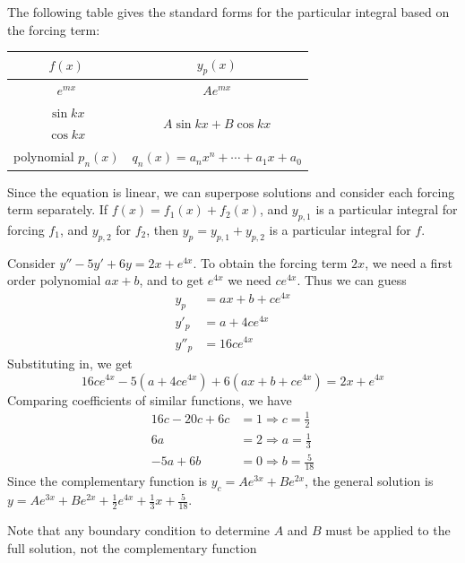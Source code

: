 \documentclass[a4paper]{article}
\begin{document}
\begin{remark}
  The following table gives the standard forms for the particular integral based on the forcing term:
  \begin{center}
    \begin{tabular}{cc}
      \toprule
      $f(x)$ & $y_p(x)$\\
      \midrule
      $e^{mx}$ & $Ae^{mx}$\\
      $\sin kx$ & \multirow{2}{*}{$A\sin kx + B\cos kx$}\\
      $\cos kx$ & \\
      polynomial $p_n(x)$ & $q_n(x) = a_nx^n + \cdots + a_1x + a_0$\\
      \bottomrule
    \end{tabular}
  \end{center}
\end{remark}
\begin{remark}
  Since the equation is linear, we can superpose solutions and consider each forcing term separately. If $f(x) = f_1(x) + f_2(x)$, and $y_{p,1}$ is a particular integral for forcing $f_1$, and $y_{p,2}$ for $f_2$, then $y_p = y_{p,1} + y_{p,2}$ is a particular integral for $f$.
\end{remark}

\begin{eg}
  Consider $y'' - 5y' + 6y = 2x + e^{4x}$. To obtain the forcing term $2x$, we need a first order polynomial $ax + b$, and to get $e^{4x}$ we need $ce^{4x}$. Thus we can guess
  \begin{align*}
    y_p &= ax + b + ce^{4x}\\
    y'_p &= a + 4ce^{4x}\\
    y''_p &= 16ce^{4x}
  \end{align*}
  Substituting in, we get
  \[
    16ce^{4x} - 5(a + 4ce^{4x}) + 6(ax + b + ce^{4x}) = 2x + e^{4x}
  \]
  Comparing coefficients of similar functions, we have
  \begin{align*}
    16c - 20c + 6c &= 1\Rightarrow c = \frac{1}{2}\\
    6a &= 2 \Rightarrow a = \frac{1}{3}\\
    -5a + 6b &= 0 \Rightarrow b = \frac{5}{18}
  \end{align*}
  Since the complementary function is $y_c = Ae^{3x} + Be^{2x}$, the general solution is $y = Ae^{3x} + Be^{2x} + \frac{1}{2}e^{4x} + \frac{1}{3}x + \frac{5}{18}$.

  Note that any boundary condition to determine $A$ and $B$ must be applied to the full solution, not the complementary function
\end{eg}
\end{document}
